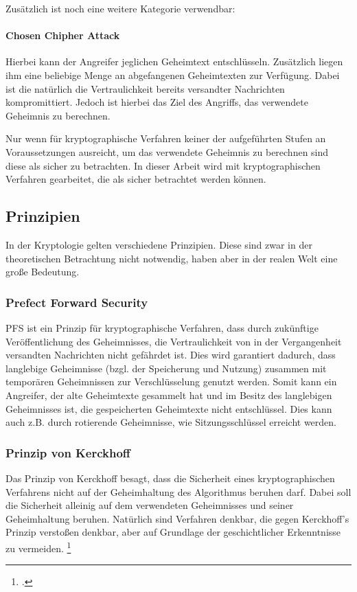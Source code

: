         Zusätzlich ist noch eine weitere Kategorie verwendbar:
        \paragraph{Chosen Chipher Attack}
            Hierbei kann der Angreifer jeglichen Geheimtext entschlüsseln. Zusätzlich liegen ihm eine beliebige Menge an abgefangenen Geheimtexten zur Verfügung. Dabei ist die natürlich die Vertraulichkeit bereits versandter Nachrichten kompromittiert. Jedoch ist hierbei das Ziel des Angriffs, das verwendete Geheimnis zu berechnen.
            
        Nur wenn für kryptographische Verfahren keiner der aufgeführten Stufen an Voraussetzungen ausreicht, um das verwendete Geheimnis zu berechnen sind diese als sicher zu betrachten. In dieser Arbeit wird mit kryptographischen Verfahren gearbeitet, die als sicher betrachtet werden können.

    \subsection{Prinzipien}
        In der Kryptologie gelten verschiedene Prinzipien. Diese sind zwar in der theoretischen Betrachtung nicht notwendig, haben aber in der realen Welt eine große Bedeutung.
        \subsubsection{Prefect Forward Security}
            \ac{PFS} ist ein Prinzip für kryptographische Verfahren, dass durch zukünftige Veröffentlichung des Geheimnisses, die Vertraulichkeit von in der Vergangenheit versandten Nachrichten nicht gefährdet ist. Dies wird garantiert dadurch, dass langlebige Geheimnisse (bzgl. der Speicherung und Nutzung) zusammen mit temporären Geheimnissen zur Verschlüsselung genutzt werden. Somit kann ein Angreifer, der alte Geheimtexte gesammelt hat und im Besitz des langlebigen Geheimnisses ist, die gespeicherten Geheimtexte nicht entschlüssel. Dies kann auch z.B. durch rotierende Geheimnisse, wie Sitzungsschlüssel erreicht werden.  

        \subsubsection{Prinzip von Kerckhoff}
            Das Prinzip von Kerckhoff besagt, dass die Sicherheit eines kryptographischen Verfahrens nicht auf der Geheimhaltung des Algorithmus beruhen darf. Dabei soll die Sicherheit alleinig auf dem verwendeten Geheimnisses und seiner Geheimhaltung beruhen. Natürlich sind Verfahren denkbar, die gegen Kerckhoff's Prinzip verstoßen denkbar, aber auf Grundlage der geschichtlicher Erkenntnisse zu vermeiden. \footcite[19]{Beutelspacher.2015}


